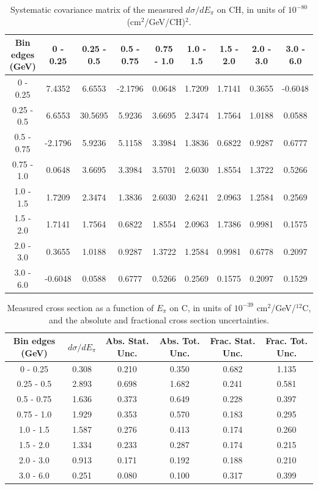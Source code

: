 \documentclass[aps,prl,twocolumn,superscriptaddress,nofootinbib]{revtex4-1}
\begin{document}
\begin{table}[h!]
  \centering
  \caption{Systematic covariance matrix of the measured $d\sigma/dE_{\pi}$ on CH, in units of $10^{-80}$ (cm$^{2}$/GeV/CH)$^{2}$.}
    \begin{tabular}{c||cccccccc}
      Bin edges (GeV) & 0 - 0.25 & 0.25 - 0.5 & 0.5 - 0.75 & 0.75 - 1.0 & 1.0 - 1.5 & 1.5 - 2.0 & 2.0 - 3.0 & 3.0 - 6.0 \\
\hline \hline
        0 - 0.25 &  7.4352 &  6.6553 & -2.1796 &  0.0648 &  1.7209 &  1.7141 &  0.3655 & -0.6048 \\
      0.25 - 0.5 &  6.6553 & 30.5695 &  5.9236 &  3.6695 &  2.3474 &  1.7564 &  1.0188 &  0.0588 \\
      0.5 - 0.75 & -2.1796 &  5.9236 &  5.1158 &  3.3984 &  1.3836 &  0.6822 &  0.9287 &  0.6777 \\
      0.75 - 1.0 &  0.0648 &  3.6695 &  3.3984 &  3.5701 &  2.6030 &  1.8554 &  1.3722 &  0.5266 \\
       1.0 - 1.5 &  1.7209 &  2.3474 &  1.3836 &  2.6030 &  2.6241 &  2.0963 &  1.2584 &  0.2569 \\
       1.5 - 2.0 &  1.7141 &  1.7564 &  0.6822 &  1.8554 &  2.0963 &  1.7386 &  0.9981 &  0.1575 \\
       2.0 - 3.0 &  0.3655 &  1.0188 &  0.9287 &  1.3722 &  1.2584 &  0.9981 &  0.6778 &  0.2097 \\
       3.0 - 6.0 & -0.6048 &  0.0588 &  0.6777 &  0.5266 &  0.2569 &  0.1575 &  0.2097 &  0.1529 \\
    \end{tabular}
  \label{tablecov:CH_Systematic_Epi}
\end{table}

\begin{table}[h!]
  \centering
  \caption{Measured cross section as a function of $E_{\pi}$ on C, in units of
  $10^{-39}$ $\text{cm}^{2}$/GeV/$^{12}$C, and the absolute and
  fractional cross section uncertainties.}
    \begin{tabular}{c||c||c|c||c|c}
      Bin edges (GeV)  &  $d\sigma/dE_{\pi}$  &  Abs. Stat. Unc. & Abs. Tot. Unc.  &  Frac. Stat. Unc.  &  Frac. Tot. Unc. \\
      \hline\hline
        0 - 0.25 & 0.308 & 0.210 & 0.350 & 0.682 & 1.135 \\
      0.25 - 0.5 & 2.893 & 0.698 & 1.682 & 0.241 & 0.581 \\
      0.5 - 0.75 & 1.636 & 0.373 & 0.649 & 0.228 & 0.397 \\
      0.75 - 1.0 & 1.929 & 0.353 & 0.570 & 0.183 & 0.295 \\
       1.0 - 1.5 & 1.587 & 0.276 & 0.413 & 0.174 & 0.260 \\
       1.5 - 2.0 & 1.334 & 0.233 & 0.287 & 0.174 & 0.215 \\
       2.0 - 3.0 & 0.913 & 0.171 & 0.192 & 0.188 & 0.210 \\
       3.0 - 6.0 & 0.251 & 0.080 & 0.100 & 0.317 & 0.399 \\
    \end{tabular}
  \label{table:EpiXSec_C}
\end{table}
\end{document}
